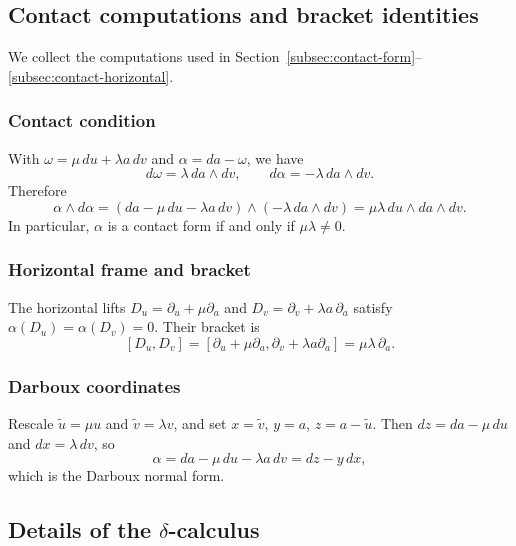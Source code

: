 
\subsection{Contact computations and bracket identities}\label{subsec:appB-contact}

We collect the computations used in Section~\ref{subsec:contact-form}--\ref{subsec:contact-horizontal}.

\subsubsection*{Contact condition}
With $\omega=\mu\,du+\lambda a\,dv$ and $\alpha=da-\omega$, we have
\[
d\omega=\lambda\,da\wedge dv,
\qquad
d\alpha=-\lambda\,da\wedge dv.
\]
Therefore
\[
\alpha\wedge d\alpha
=(da-\mu\,du-\lambda a\,dv)\wedge(-\lambda\,da\wedge dv)
=\mu\lambda\,du\wedge da\wedge dv.
\]
In particular, $\alpha$ is a contact form if and only if $\mu\lambda\neq 0$.

\subsubsection*{Horizontal frame and bracket}
The horizontal lifts $D_u=\partial_u+\mu\partial_a$ and $D_v=\partial_v+\lambda a\,\partial_a$ satisfy $\alpha(D_u)=\alpha(D_v)=0$. Their bracket is
\[
[D_u,D_v]=[\partial_u+\mu\partial_a,\partial_v+\lambda a\partial_a]=\mu\lambda\,\partial_a.
\]

\subsubsection*{Darboux coordinates}
Rescale $\tilde u=\mu u$ and $\tilde v=\lambda v$, and set $x=\tilde v$, $y=a$, $z=a-\tilde u$. Then $dz=da-\mu\,du$ and $dx=\lambda\,dv$, so
\[
\alpha=da-\mu\,du-\lambda a\,dv=dz-y\,dx,
\]
which is the Darboux normal form.

\subsection{Details of the \texorpdfstring{$\delta$}{delta}-calculus}\label{subsec:appB-delta}

